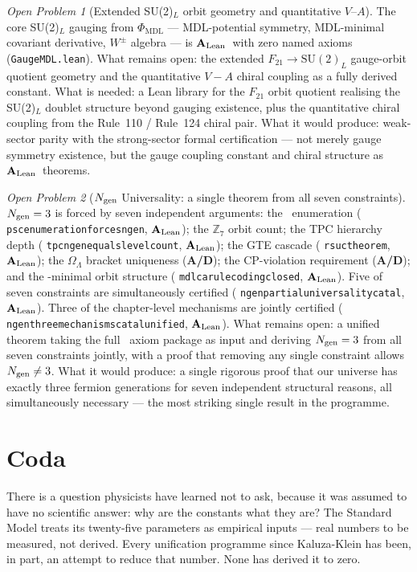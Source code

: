 \documentclass[11pt,openany]{book}
\theoremstyle{remark}
\newtheorem{openprob}{Open Problem}[chapter]
\newcommand{\MDL}{\text{MDL}}
\newcommand{\PSC}{\text{PSC}}
\newcommand{\PHIMDL}{\Phi_{\mathrm{MDL}}}
\newcommand{\ZS}{\mathbb{Z}_7}
\newcommand{\lean}[1]{%
  \penalty-100
  \begingroup\def\_{\textunderscore\allowbreak}\texttt{#1}\endgroup}
\newcommand{\OmL}{\Omega_\Lambda}
\newcommand{\Ngen}{N_{\rm gen}}
\newcommand{\CatAL}{\ensuremath{\textbf{A}_{\rm Lean}}}
\newcommand{\CatAD}{\textbf{A/D}}
\begin{document}
\begin{openprob}[Extended SU(2)$_L$ orbit geometry and quantitative $V$--$A$]
The core SU(2)$_L$ gauging from $\PHIMDL$ --- MDL-potential symmetry, MDL-minimal
covariant derivative, $W^\pm$ algebra --- is \CatAL\ with zero named axioms
(\texttt{GaugeMDL.lean}). What remains open: the extended $F_{21} \to \mathrm{SU}(2)_L$
gauge-orbit quotient geometry and the quantitative $V{-}A$ chiral coupling as a
fully derived constant. What is needed: a Lean library for the $F_{21}$ orbit
quotient realising the SU(2)$_L$ doublet structure beyond gauging existence, plus
the quantitative chiral coupling from the Rule~110 / Rule~124 chiral pair. What it
would produce: weak-sector parity with the strong-sector formal certification ---
not merely gauge symmetry existence, but the gauge coupling constant and chiral
structure as \CatAL\ theorems.
\end{openprob}

\begin{openprob}[$\Ngen$ Universality: a single theorem from all seven constraints]
$\Ngen = 3$ is forced by seven independent arguments: the \PSC\ enumeration
(\lean{psc\_enumeration\_forces\_ngen\_3}, \CatAL); the $\ZS$ orbit count; the
TPC hierarchy depth (\lean{tpc\_ngen\_equals\_level\_count}, \CatAL); the GTE
cascade (\lean{rsuc\_theorem}, \CatAL); the $\OmL$ bracket uniqueness (\CatAD);
the CP-violation requirement (\CatAD); and the \MDL-minimal orbit structure
(\lean{mdl\_ca\_rule\_coding\_closed}, \CatAL). Five of seven constraints are
simultaneously certified (\lean{ngen\_partial\_universality\_catal}, \CatAL).
Three of the chapter-level mechanisms are jointly certified
(\lean{ngen\_three\_mechanisms\_catal\_unified}, \CatAL).
What remains open: a unified theorem taking the full \PSC\ axiom package as input
and deriving $\Ngen = 3$ from all seven constraints jointly, with a proof that
removing any single constraint allows $\Ngen \neq 3$. What it would produce: a
single rigorous proof that our universe has exactly three fermion generations for
seven independent structural reasons, all simultaneously necessary --- the most
striking single result in the programme.
\end{openprob}

\section{Coda}
\label{sec:coda}

There is a question physicists have learned not to ask, because it was assumed to
have no scientific answer: why are the constants what they are? The Standard Model
treats its twenty-five parameters as empirical inputs --- real numbers to be measured,
not derived. Every unification programme since Kaluza-Klein has been, in part, an
attempt to reduce that number. None has derived it to zero.
\end{document}
